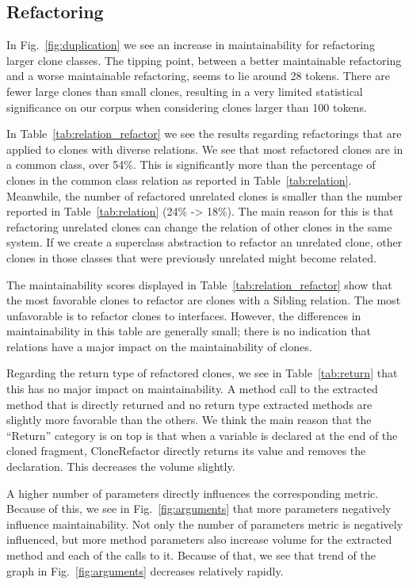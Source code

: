 \subsection{Refactoring}
In Fig.~\ref{fig:duplication} we see an increase in maintainability for refactoring larger clone classes. The tipping point, between a better maintainable refactoring and a worse maintainable refactoring, seems to lie around 28 tokens. There are fewer large clones than small clones, resulting in a very limited statistical significance on our corpus when considering clones larger than 100 tokens.

In Table~\ref{tab:relation_refactor} we see the results regarding refactorings that are applied to clones with diverse relations. We see that most refactored clones are in a common class, over 54\%. This is significantly more than the percentage of clones in the common class relation as reported in Table~\ref{tab:relation}. Meanwhile, the number of refactored unrelated clones is smaller than the number reported in Table~\ref{tab:relation} (24\% -> 18\%). The main reason for this is that refactoring unrelated clones can change the relation of other clones in the same system. If we create a superclass abstraction to refactor an unrelated clone, other clones in those classes that were previously unrelated might become related.

The maintainability scores displayed in Table~\ref{tab:relation_refactor} show that the most favorable clones to refactor are clones with a Sibling relation. The most unfavorable is to refactor clones to interfaces. However, the differences in maintainability in this table are generally small; there is no indication that relations have a major impact on the maintainability of clones.

Regarding the return type of refactored clones, we see in Table~\ref{tab:return} that this has no major impact on maintainability. A method call to the extracted method that is directly returned and no return type extracted methods are slightly more favorable than the others. We think the main reason that the ``Return'' category is on top is that when a variable is declared at the end of the cloned fragment, CloneRefactor directly returns its value and removes the declaration. This decreases the volume slightly.

A higher number of parameters directly influences the corresponding metric. Because of this, we see in Fig.~\ref{fig:arguments} that more parameters negatively influence maintainability. Not only the number of parameters metric is negatively influenced, but more method parameters also increase volume for the extracted method and each of the calls to it. Because of that, we see that trend of the graph in Fig.~\ref{fig:arguments} decreases relatively rapidly.
